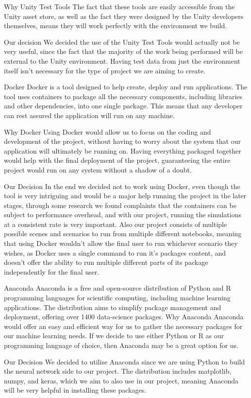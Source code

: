 Why Unity Test Tools
The fact that these tools are easily accessible from the Unity asset store, as well as the fact they were designed by the Unity developers themselves, means they will work perfectly with the environment we build.

Our decision
We decided the use of the Unity Test Tools would actually not be very useful, since the fact that the majority of the work being performed will be external to the Unity environment. Having test data from just the environment itself isn’t necessary for the type of project we are aiming to create.







Docker
Docker is a tool designed to help create, deploy and run applications. The tool uses containers to package all the necessary components, including libraries and other dependencies, into one single package. This means that any developer can rest assured the application will run on any machine.

Why Docker
Using Docker would allow us to focus on the coding and development of the project, without having to worry about the system that our application will ultimately be running on. Having everything packaged together would help with the final deployment of the project, guaranteeing the entire project would run on any system without a shadow of a doubt.

Our Decision
In the end we decided not to work using Docker, even though the tool is very intriguing and would be a major help running the project in the later stages, through some research we found complaints that the containers can be subject to performance overhead, and with our project, running the simulations at a consistent rate is very important. Also our project consists of multiple possible scenes and scenarios to run from multiple different notebooks, meaning that using Docker wouldn’t allow the final user to run whichever scenario they wishes, as Docker uses a single command to run it’s packages content, and doesn’t offer the ability to run multiple different parts of its package independently for the final user.


Anaconda
Anaconda is a free and open-source distribution of Python and R programming languages for scientific computing, including machine learning applications. The distribution aims to simplify package management and deployment, offering over 1400 data-science packages.
Why Anaconda
Anaconda would offer an easy and efficient way for us to gather the necessary packages for our machine learning needs. If we decide to use either Python or R as our programming language of choice, then Anaconda may be a great option for us.

Our Decision
We decided to utilise Anaconda since we are using Python to build the neural network side to our project. The distribution includes matplotlib, numpy, and keras, which we aim to also use in our project, meaning Anaconda will be very helpful in installing these packages.



